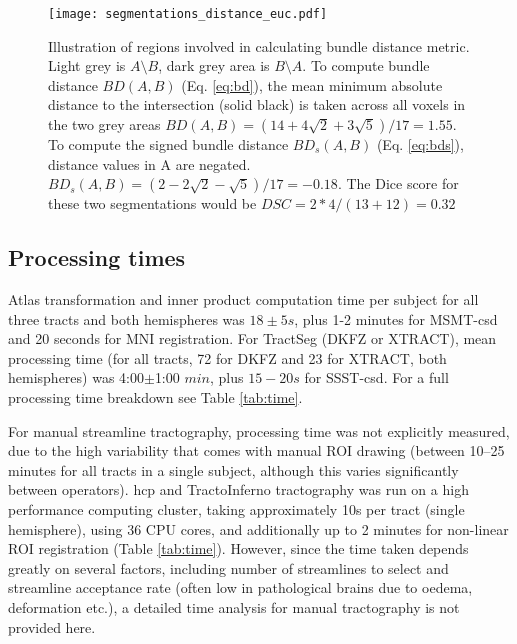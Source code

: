 \begin{figure}
  \centering
  \texttt{[image: segmentations\_distance\_euc.pdf]}
  \caption{Illustration of regions involved in calculating bundle distance metric. Light grey is $A\setminus B$, dark grey area is $B\setminus A$. To compute bundle distance $BD(A,B)$ (Eq. \ref{eq:bd}), the mean minimum absolute distance to the intersection (solid black) is taken across all voxels in the two grey areas $BD(A,B) = (14+4\sqrt{2}+3\sqrt{5})/17 = 1.55$. To compute the signed bundle distance $BD_s(A,B)$ (Eq. \ref{eq:bds}), distance values in A are negated. $BD_s(A,B) = (2-2\sqrt{2}-\sqrt{5})/17 = -0.18$. The Dice score for these two segmentations would be $DSC = 2*4/(13+12) = 0.32$}
  \label{fig:BD}
\end{figure}

\subsection{Processing times}

Atlas transformation and inner product computation time per subject for all three tracts and both hemispheres was $18\pm5 s$, plus 1-2 minutes for MSMT-\gls{csd} and 20 seconds for MNI registration.
For TractSeg (DKFZ or XTRACT), mean processing time (for all tracts, 72 for DKFZ and 23 for XTRACT, both hemispheres) was 4:00$\pm$1:00 $min$, plus $15-20 s$ for SSST-\gls{csd}.
For a full processing time breakdown see Table \ref{tab:time}.

For manual streamline tractography, processing time was not explicitly measured, due to the high variability that comes with manual ROI drawing (between 10--25 minutes for all tracts in a single subject, although this varies significantly between operators).
\Gls{hcp} and TractoInferno tractography was run on a high performance computing cluster, taking approximately 10s per tract (single hemisphere), using 36 CPU cores, and additionally up to 2 minutes for non-linear ROI registration (Table \ref{tab:time}).
However, since the time taken depends greatly on several factors, including number of streamlines to select and streamline acceptance rate (often low in pathological brains due to oedema, deformation etc.), a detailed time analysis for manual tractography is not provided here.


